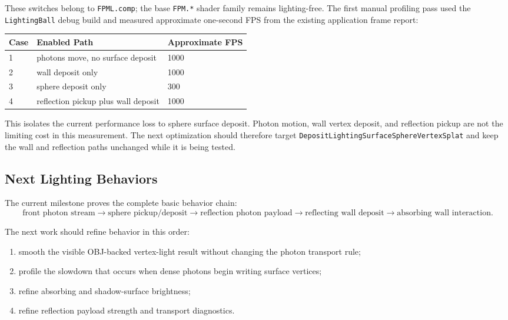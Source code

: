 These switches belong to \texttt{FPML.comp}; the base \texttt{FPM.*} shader
family remains lighting-free.  The first manual profiling pass used the
\texttt{LightingBall} debug build and measured approximate one-second FPS
from the existing application frame report:
\begin{center}
\begin{tabular}{lll}
\toprule
Case & Enabled Path & Approximate FPS \\
\midrule
1 & photons move, no surface deposit & 1000 \\
2 & wall deposit only & 1000 \\
3 & sphere deposit only & 300 \\
4 & reflection pickup plus wall deposit & 1000 \\
\bottomrule
\end{tabular}
\end{center}

This isolates the current performance loss to sphere surface deposit.  Photon
motion, wall vertex deposit, and reflection pickup are not the limiting cost
in this measurement.  The next optimization should therefore target
\texttt{DepositLightingSurfaceSphereVertexSplat} and keep the wall and
reflection paths unchanged while it is being tested.

\subsection{Next Lighting Behaviors}

The current milestone proves the complete basic behavior chain:
\[
    \textrm{front photon stream}
    \rightarrow
    \textrm{sphere pickup/deposit}
    \rightarrow
    \textrm{reflection photon payload}
    \rightarrow
    \textrm{reflecting wall deposit}
    \rightarrow
    \textrm{absorbing wall interaction}.
\]

The next work should refine behavior in this order:
\begin{enumerate}
    \item smooth the visible OBJ-backed vertex-light result without changing
          the photon transport rule;
    \item profile the slowdown that occurs when dense photons begin writing
          surface vertices;
    \item refine absorbing and shadow-surface brightness;
    \item refine reflection payload strength and transport diagnostics.
\end{enumerate}

